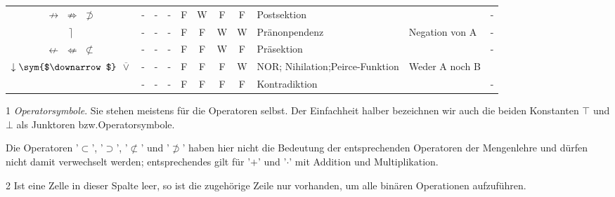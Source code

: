 \documentclass[english,ngerman,parskip=half,headsepline,footsepline,
	fleqn,notitlepage]{scrreprt}
\makeatletter
\newcommand*{\texttrue}{W}%
\newcommand*{\textfalse}{F}%
\newcommand*{\ltrue}{\top}%
\newcommand*{\lfalse}{\bot}%
\newcommand*{\lnimp}{\nrightarrow}%
\newcommand*{\lnimpA}{\nRightarrow}%
\newcommand*{\lnimpB}{\nsupset}%
\newcommand*{\lnleft}{\rceil}%
\newcommand*{\lnrep}{\nleftarrow}%
\newcommand*{\lnrepA}{\nLeftarrow}%
\newcommand*{\lnrepB}{\nsubset}%
\newcommand*{\lnor}{\downarrow}%
\newcommand*{\lnorA}{\operatorname{\overline\vee}}%
\newcommand*{\charqt}[1]{'#1'}%
\newcommand*{\symqt}[1]{\charqt{#1}}%
\newcommand*{\textbzw}{bzw.\@ }
\newcommand*{\Sym}[1]{#1\sym{$#1$}}%
\makeatother
\begin{document}
\begin{table}
\begin{threeparttable}
\begin{tabularx}{\linewidth-10.95pt}{c||c:cc:cccc|X:X|c|}
				\tableline%

				$\lnimp$ $\lnimpA$ $\lnimpB$
				& - & - & - &\textfalse&\texttrue&\textfalse&\textfalse
				& Postsektion
				&
				& - \\

				\tablegroup%

				$\lnleft$
				& - & - & - &\textfalse&\textfalse&\texttrue&\texttrue
				& Pränonpendenz
				& Negation von A
				& - \\

				\tableline%

				$\lnrep$ $\lnrepA$ $\lnrepB$
				& - & - & - &\textfalse&\textfalse&\texttrue&\textfalse
				& Präsektion
				&
				& - \\

				\tableline%

				$\Sym{\lnor}$ $\lnorA$
				& - & - & - &\textfalse&\textfalse&\textfalse&\texttrue
				& NOR; Nihilation;\newline Peirce-Funktion
				& Weder A noch B
				& \thepnor \\

				\tableline%

				~
				& - & - & - &\textfalse&\textfalse&\textfalse&\textfalse
				& Kontradiktion
				&
				& - \\

				\hline%
			\end{tabularx}
			\begin{tablenotes}
				\footnotesize

				\item[1] \emph{Operatorsymbole}.
				Sie stehen meistens für die Operatoren selbst.
				Der Einfachheit halber bezeichnen wir auch die beiden Konstanten $\ltrue$ und $\lfalse$ als Junktoren \textbzw Operatorsymbole.

				Die Operatoren \symqt{$\subset$}, \symqt{$\supset$}, \symqt{$\nsubset$} und \symqt{$\nsupset$} haben hier nicht die Bedeutung der entsprechenden Operatoren der Mengenlehre und dürfen nicht damit verwechselt werden; entsprechendes gilt für \symqt{$+$} und \symqt{$\cdot$} mit Addition und Multiplikation.

				\item[2] Ist eine Zelle in dieser Spalte leer, so ist die zugehörige Zeile nur vorhanden, um alle binären Operationen aufzuführen.


\end{tablenotes}
\end{threeparttable}
\end{table}
\end{document}

